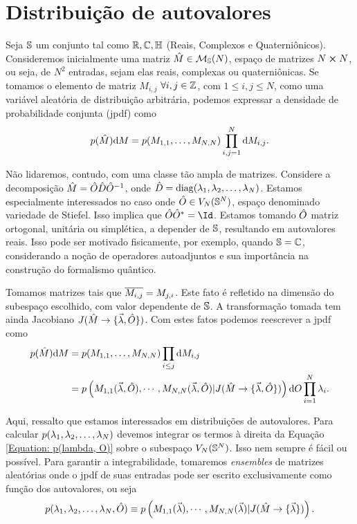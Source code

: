 \section{Distribuição de autovalores}

Seja $\mathbb{S}$ um conjunto tal como $\mathbb{R}, \mathbb{C}, \mathbb{H} $ (Reais, Complexos e Quaterniônicos). Consideremos inicialmente uma matriz $\hat M \in \mathcal{M}_{\mathbb{S}}(N)$, espaço de matrizes $N \cross N$, ou seja, de $N^2$ entradas, sejam elas reais, complexas ou quaterniônicas. Se tomamos o elemento de matriz $M_{i,j}$ $\forall i, j \in \mathbb{Z}$, com $1 \leq i, j \leq N$, como uma variável aleatória de distribuição arbitrária, podemos expressar a densidade de probabilidade conjunta (jpdf) como $$p(\hat{M}) \dd M = p(M_{1,1}, \dots, M_{N,N}) \prod_{i,j=1}^{N} \dd M_{i,j}.$$

Não lidaremos, contudo, com uma classe tão ampla de matrizes. Considere a decomposição $\hat M = \hat O \hat D \hat O^{-1}$, onde $\hat D = \operatorname{diag}(\lambda_1, \lambda_2, \dots, \lambda_N)$. Estamos especialmente interessados no caso onde $\hat O \in V_N(\mathbb{S}^N)$, espaço denominado variedade de Stiefel. Isso implica que $ \matriz{O} \matriz{O}^* = \Id$. Estamos tomando $\hat O$ matriz ortogonal, unitária ou simplética, a depender de $\mathbb{S}$, resultando em autovalores reais. Isso pode ser motivado fisicamente, por exemplo, quando $\mathbb{S} = \mathbb{C}$, considerando a noção de operadores autoadjuntos e sua importância na construção do formalismo quântico.

Tomamos matrizes tais que $\overline{M_{i,j}} = M_{j, i}$. Este fato é refletido na dimensão do subespaço escolhido, com valor dependente de $\mathbb{S}$. A transformação tomada tem ainda Jacobiano $J(\hat M \rightarrow \{ \vec{\lambda}, \hat O \} )$. Com estes fatos podemos reescrever a jpdf como 
\begin{equation}
	\begin{split}
	 p(\hat{M}) \dd M &= p(M_{1,1}, \dots, M_{N,N}) \prod_{i \leq j} \dd M_{i,j}\\
	 & =  p \left( M_{1,1}(\vec{\lambda}, \hat O), \cdots, M_{N,N}(\vec{\lambda}, \hat O) | J(\hat M \rightarrow \{ \vec{\lambda}, \hat O \} ) \right) \dd O \prod_{i=1}^{N} \lambda_i.
	\end{split}
\label{Equation: p(lambda, O)}
\end{equation}

Aqui, ressalto que estamos interessados em distribuições de autovalores. Para calcular $p(\lambda_1, \lambda_2, \dots, \lambda_N)$ devemos integrar os termos à direita da Equação \ref{Equation: p(lambda, O)} sobre o subespaço $V_N(\mathbb{S}^N)$. Isso nem sempre é fácil ou possível. Para garantir a integrabilidade, tomaremos \textit{ensembles} de matrizes aleatórias onde o jpdf de suas entradas pode ser escrito exclusivamente como função dos autovalores, ou seja $$p(\lambda_1, \lambda_2, \dots, \lambda_N, \hat O) \equiv p \left( M_{1,1}(\vec{\lambda}), \cdots, M_{N,N}(\vec{\lambda}) | J(\hat M \rightarrow \{ \vec{\lambda} \} ) \right).$$

